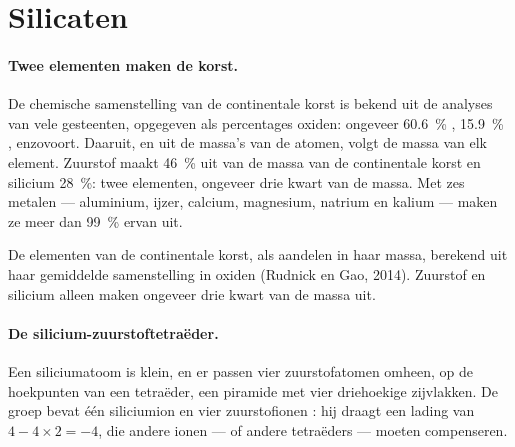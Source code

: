 \section{Silicaten}

\paragraph{Twee elementen maken de korst.} De chemische samenstelling van de
continentale korst is bekend uit de analyses van vele gesteenten, opgegeven als
percentages oxiden: ongeveer \qty{60.6}{\percent} ,
\qty{15.9}{\percent} , enzovoort. Daaruit, en uit de massa's van
de atomen, volgt de massa van elk element. Zuurstof maakt \qty{46}{\percent}
uit van de massa van de continentale korst en silicium \qty{28}{\percent}: twee
elementen, ongeveer drie kwart van de massa. Met zes metalen --- aluminium,
ijzer, calcium, magnesium, natrium en kalium --- maken ze meer dan
\qty{99}{\percent} ervan uit.

\begin{omfigure}

{\small De elementen van de continentale korst, als aandelen in haar massa,
berekend uit haar gemiddelde samenstelling in oxiden (Rudnick en Gao, 2014).
Zuurstof en silicium alleen maken ongeveer drie kwart van de massa uit.}
\end{omfigure}

\paragraph{De silicium-zuurstoftetraëder.} Een siliciumatoom is klein, en
er passen vier zuurstofatomen omheen, op de hoekpunten van een tetraëder, een piramide
met vier driehoekige zijvlakken. De groep bevat één siliciumion  en
vier zuurstofionen : hij draagt een lading van $4 - 4 \times 2 = -4$,
die andere ionen --- of andere tetraëders --- moeten compenseren.

